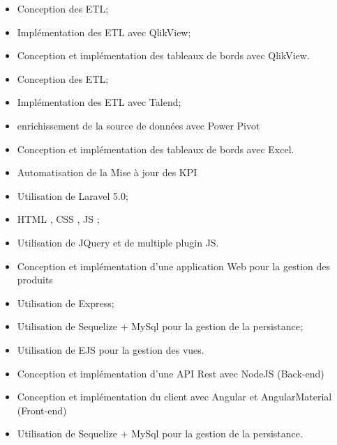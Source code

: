 \documentclass[11.5pt,a4paper]{moderncv}
\begin{document}
{%
\begin{itemize}%
	\item Conception des ETL;
	\item Implémentation des ETL avec QlikView;
	\item Conception et implémentation des tableaux de bords avec QlikView.
\end{itemize}}
%
{%
\begin{itemize}%
	\item Conception des ETL;
	\item Implémentation des ETL avec Talend;
	\item enrichissement de la source de données avec Power Pivot
	\item Conception et implémentation des tableaux de bords avec Excel.
\end{itemize}}
%
{%
\begin{itemize}%
	\item Automatisation de la Mise à jour des KPI
	\item Utilisation de Laravel 5.0;
	\item HTML , CSS , JS ;
	\item Utilisation de JQuery et de multiple plugin JS.
\end{itemize}}
%
{%
\begin{itemize}%
	\item Conception et implémentation d'une application Web pour la gestion des produits 
	\item Utilisation de Express;
	\item Utilisation de Sequelize + MySql pour la gestion de la persistance;
	\item Utilisation de EJS pour la gestion des vues.
\end{itemize}}
%
{%
\begin{itemize}%
	\item Conception et implémentation d'une API Rest avec NodeJS (Back-end)
	\item Conception et implémentation du client avec Angular et AngularMaterial (Front-end)
	\item Utilisation de Sequelize + MySql pour la gestion de la persistance.
\end{itemize}}
\end{document}
